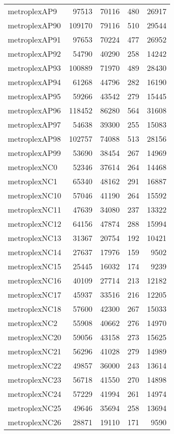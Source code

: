 \begin{tabular}{lrrrr}
metroplexAP9 & 97513 & 70116 & 480 & 26917 \\
metroplexAP90 & 109170 & 79116 & 510 & 29544 \\
metroplexAP91 & 97653 & 70224 & 477 & 26952 \\
metroplexAP92 & 54790 & 40290 & 258 & 14242 \\
metroplexAP93 & 100889 & 71970 & 489 & 28430 \\
metroplexAP94 & 61268 & 44796 & 282 & 16190 \\
metroplexAP95 & 59266 & 43542 & 279 & 15445 \\
metroplexAP96 & 118452 & 86280 & 564 & 31608 \\
metroplexAP97 & 54638 & 39300 & 255 & 15083 \\
metroplexAP98 & 102757 & 74088 & 513 & 28156 \\
metroplexAP99 & 53690 & 38454 & 267 & 14969 \\
metroplexNC0 & 52346 & 37614 & 264 & 14468 \\
metroplexNC1 & 65340 & 48162 & 291 & 16887 \\
metroplexNC10 & 57046 & 41190 & 264 & 15592 \\
metroplexNC11 & 47639 & 34080 & 237 & 13322 \\
metroplexNC12 & 64156 & 47874 & 288 & 15994 \\
metroplexNC13 & 31367 & 20754 & 192 & 10421 \\
metroplexNC14 & 27637 & 17976 & 159 & 9502 \\
metroplexNC15 & 25445 & 16032 & 174 & 9239 \\
metroplexNC16 & 40109 & 27714 & 213 & 12182 \\
metroplexNC17 & 45937 & 33516 & 216 & 12205 \\
metroplexNC18 & 57600 & 42300 & 267 & 15033 \\
metroplexNC2 & 55908 & 40662 & 276 & 14970 \\
metroplexNC20 & 59056 & 43158 & 273 & 15625 \\
metroplexNC21 & 56296 & 41028 & 279 & 14989 \\
metroplexNC22 & 49857 & 36000 & 243 & 13614 \\
metroplexNC23 & 56718 & 41550 & 270 & 14898 \\
metroplexNC24 & 57229 & 41994 & 261 & 14974 \\
metroplexNC25 & 49646 & 35694 & 258 & 13694 \\
metroplexNC26 & 28871 & 19110 & 171 & 9590 \\

\end{tabular}

